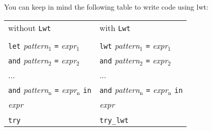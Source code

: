 You can keep in mind the following table to write code using lwt:



\noindent
\begin{tabular}{p{}p{}}
\multicolumn{1}{l}{\begin{minipage}{0.5\textwidth}\centering  without {\tt Lwt}                                                               \end{minipage}}&\multicolumn{1}{l}{\begin{minipage}{0.5\textwidth}\centering  with {\tt Lwt}                                                                      \end{minipage}}\\
                                                                                  &                                                                                      \\
 {\tt let} \emph{pattern$_{\mbox{1}}$} {\tt =} \emph{expr$_{\mbox{1}}$}                                 & {\tt lwt} \emph{pattern$_{\mbox{1}}$} {\tt =} \emph{expr$_{\mbox{1}}$}                                     \\
 {\tt and} \emph{pattern$_{\mbox{2}}$} {\tt =} \emph{expr$_{\mbox{2}}$}                                 & {\tt and} \emph{pattern$_{\mbox{2}}$} {\tt =} \emph{expr$_{\mbox{2}}$}                                     \\
 ...                                                                              & ...                                                                                  \\
 {\tt and} \emph{pattern$_{\mbox{n}}$} {\tt =} \emph{expr$_{\mbox{n}}$} {\tt in}                        & {\tt and} \emph{pattern$_{\mbox{n}}$} {\tt =} \emph{expr$_{\mbox{n}}$} {\tt in}                            \\
 \emph{expr}                                                                         & \emph{expr}                                                                             \\
                                                                                  &                                                                                      \\
 {\tt try}                                                                        & {\tt try\_lwt}                                                                        \\

\end{tabular}
